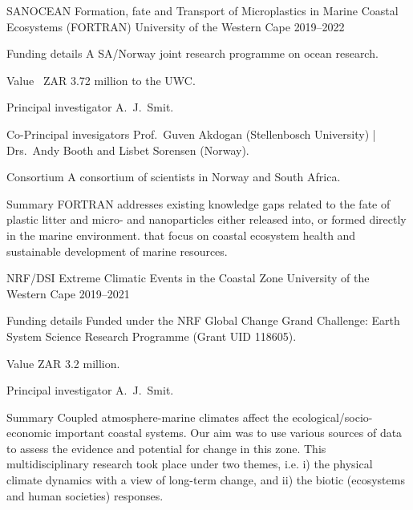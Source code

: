 \begin{cventries}

\cventry
{SANOCEAN} %
{Formation, fate and Transport of Microplastics in Marine Coastal Ecosystems (FORTRAN)} %
{University of the Western Cape} %
{2019--2022} %
{ %
\begin{cvdescription}
    \item[Funding details] A SA/Norway joint research programme on ocean research.
    \item[Value] {~ZAR 3.72 million to the UWC.}
    \item[Principal investigator] A.~J.~Smit.
    \item[Co-Principal invesigators] Prof.~Guven Akdogan (Stellenbosch University) | Drs.~Andy Booth and Lisbet Sorensen (Norway).
    \item[Consortium] A consortium of scientists in Norway and South Africa.
    \item[Summary] {
        FORTRAN addresses existing knowledge gaps related to the fate of plastic litter and micro- and nanoparticles either released into, or formed directly in the marine environment.
that focus on coastal ecosystem health and sustainable development of marine resources.}
\end{cvdescription}
}


\cventry
{NRF/DSI} %
{Extreme Climatic Events in the Coastal Zone} %
{University of the Western Cape} %
{2019--2021} %
{ %
\begin{cvdescription}
    \item[Funding details] Funded under the NRF Global Change Grand Challenge: Earth System Science Research Programme (Grant UID 118605).
    \item[Value] {ZAR 3.2 million.}
    \item[Principal investigator] A.~J.~Smit.
    \item[Summary] {
        Coupled atmosphere-marine climates affect the ecological/socio-economic important coastal systems. Our aim was to use various sources of data to assess the evidence and potential for change in this zone. This multidisciplinary research took place under two themes, i.e. i) the physical climate dynamics with a view of long-term change, and ii) the biotic (ecosystems and human societies) responses.}
\end{cvdescription}
}


\end{cventries}
